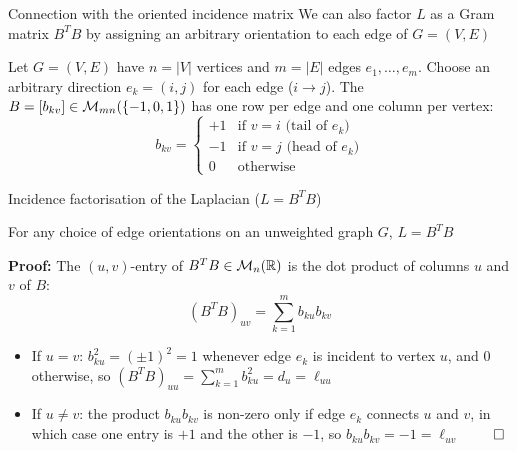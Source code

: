 \documentclass[aspectratio=169]{beamer}\usepackage[]{graphicx}\usepackage[]{xcolor}
\begin{document}
\begin{frame}{Connection with the oriented incidence matrix}
We can also factor $L$ as a Gram matrix $B^T B$ by assigning an arbitrary orientation to each edge of $G = (V, E)$
\vfill
\begin{definition}
Let $G = (V, E)$ have $n = |V|$ vertices and $m = |E|$ edges $e_1, \ldots, e_m$. Choose an arbitrary direction $e_k = (i, j)$ for each edge ($i \to j$). The  $B = [b_{kv}] \in \mathcal{M}_{mn}(\{-1, 0, 1\})$ has one row per edge and one column per vertex:
\[
b_{kv} = \begin{cases}
+1 & \text{if } v = i \text{ (tail of } e_k\text{)} \\
-1 & \text{if } v = j \text{ (head of } e_k\text{)} \\
0 & \text{otherwise}
\end{cases}
\]
\end{definition}
\end{frame}


\begin{frame}{Incidence factorisation of the Laplacian ($L = B^T B$)}
\begin{proposition}
\label{prop:incidence-laplacian}
For any choice of edge orientations on an unweighted graph $G$, $L = B^T B$
\end{proposition}
\vfill
\textbf{Proof:} The $(u, v)$-entry of $B^T B \in \mathcal{M}_n(\mathbb{R})$ is the dot product of columns $u$ and $v$ of $B$:
\[
(B^T B)_{uv} = \sum_{k=1}^m b_{ku} b_{kv}
\]
\begin{itemize}
\item If $u = v$: $b_{ku}^2 = (\pm 1)^2 = 1$ whenever edge $e_k$ is incident to vertex $u$, and $0$ otherwise, so $(B^T B)_{uu} = \sum_{k=1}^m b_{ku}^2 = d_u = \ell_{uu}$
\item If $u \neq v$: the product $b_{ku} b_{kv}$ is non-zero only if edge $e_k$ connects $u$ and $v$, in which case one entry is $+1$ and the other is $-1$, so $b_{ku} b_{kv} = -1 = \ell_{uv}$ \hfill $\qed$
\end{itemize}
\end{frame}
\end{document}
